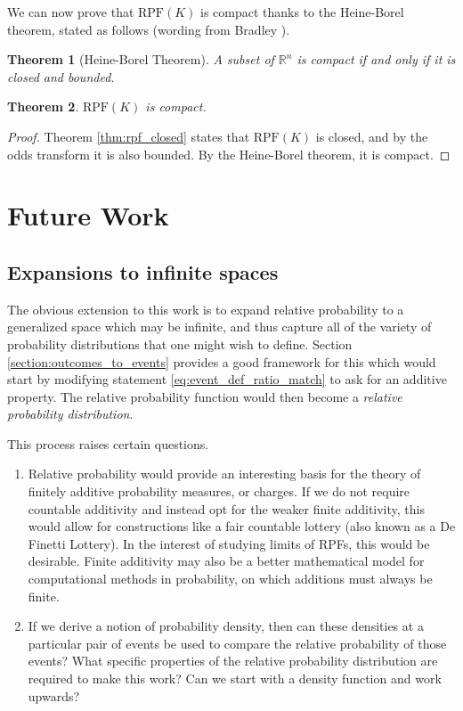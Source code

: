 \documentclass[twoside]{article}
\theoremstyle{plain}%
\newtheorem{theorem}{Theorem}[section]
\theoremstyle{definition}
\theoremstyle{remark}
\begin{document}
We can now prove that \(\text{RPF}(K)\) is compact thanks to the Heine-Borel theorem, stated as follows (wording from Bradley \cite{bradley}).

\begin{theorem}[Heine-Borel Theorem]
A subset of \(\mathbb{R}^n\) is compact if and only if it is closed and bounded.
\end{theorem}

\begin{theorem}
\(\text{RPF}(K)\) is compact.
\end{theorem}

\begin{proof}
Theorem \ref{thm:rpf_closed} states that \(\text{RPF}(K)\) is closed, and by the odds transform it is also bounded. By the Heine-Borel theorem, it is compact.
\end{proof}

\section{Future Work}
\label{section:future_work}
\subsection{Expansions to infinite spaces}
The obvious extension to this work is to expand relative probability to a generalized space which may be infinite, and thus capture all of the variety of probability distributions that one might wish to define. Section \ref{section:outcomes_to_events} provides a good framework for this which would start by modifying statement \ref{eq:event_def_ratio_match} to ask for an additive property. The relative probability function would then become a \textit{relative probability distribution}.

This process raises certain questions.
\begin{enumerate}
\item Relative probability would provide an interesting basis for the theory of finitely additive probability measures, or charges\cite{charges}. If we do not require countable additivity and instead opt for the weaker finite additivity, this would allow for constructions like a fair countable lottery (also known as a De Finetti Lottery\cite{de_finetti}). In the interest of studying limits of RPFs, this would be desirable. Finite additivity may also be a better mathematical model for computational methods in probability, on which additions must always be finite.
\item If we derive a notion of probability density, then can these densities at a particular pair of events be used to compare the relative probability of those events? What specific properties of the relative probability distribution are required to make this work? Can we start with a density function and work upwards?
\end{enumerate}
\end{document}
